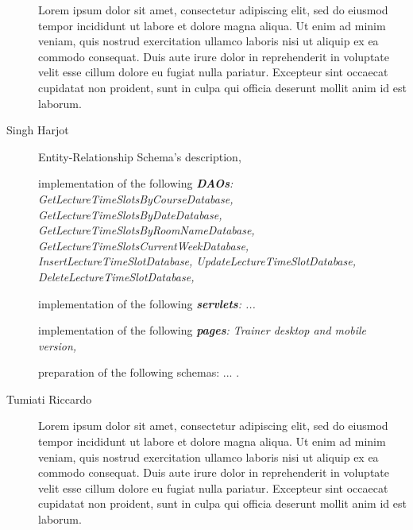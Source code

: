 \begin{description}
	Lorem ipsum dolor sit amet, consectetur adipiscing elit, sed do eiusmod tempor incididunt ut labore et dolore magna aliqua. Ut enim ad minim veniam, quis nostrud exercitation ullamco laboris nisi ut aliquip ex ea commodo consequat. Duis aute irure dolor in reprehenderit in voluptate velit esse cillum dolore eu fugiat nulla pariatur. Excepteur sint occaecat cupidatat non proident, sunt in culpa qui officia deserunt mollit anim id est laborum.
	\item[Singh Harjot] Entity-Relationship Schema's description,
	
	implementation of the following \textit{\textbf{DAOs}:
		GetLectureTimeSlotsByCourseDatabase,
		GetLectureTimeSlotsByDateDatabase,
		GetLectureTimeSlotsByRoomNameDatabase,
		GetLectureTimeSlotsCurrentWeekDatabase,
		InsertLectureTimeSlotDatabase,
		UpdateLectureTimeSlotDatabase,
		DeleteLectureTimeSlotDatabase,
	}
	
	implementation of the following \textit{\textbf{servlets}: 
		... 
	}
	
	implementation of the following \textit{\textbf{pages}: 
		Trainer desktop and mobile version,
	}
	
	preparation of the following schemas: ... .
	\item[Tumiati Riccardo] Lorem ipsum dolor sit amet, consectetur adipiscing elit, sed do eiusmod tempor incididunt ut labore et dolore magna aliqua. Ut enim ad minim veniam, quis nostrud exercitation ullamco laboris nisi ut aliquip ex ea commodo consequat. Duis aute irure dolor in reprehenderit in voluptate velit esse cillum dolore eu fugiat nulla pariatur. Excepteur sint occaecat cupidatat non proident, sunt in culpa qui officia deserunt mollit anim id est laborum.
\end{description}